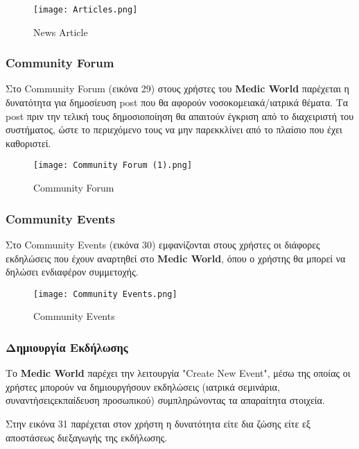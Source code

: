 \documentclass{article}
\begin{document}
\begin{figure}[!htb]
\centering
\texttt{[image: Articles.png]} 
\caption{\label{fig: news article} News Article}
\end{figure}

\subsubsection{Community Forum}

Στο Community Forum (εικόνα 29) στους χρήστες του \textbf{Medic World} παρέχεται η δυνατότητα για δημοσίευση post που θα αφορούν νοσοκομειακά/ιατρικά θέματα. Τα post πριν την τελική τους δημοσιοποίηση θα απαιτούν έγκριση από το διαχειριστή του συστήματος, ώστε το περιεχόμενο τους να μην παρεκκλίνει από το πλαίσιο που έχει καθοριστεί.

\vspace{0.3cm}

\begin{figure}[!htb]
\centering
\texttt{[image: Community Forum (1).png]} 
\caption{\label{fig: community forum} Community Forum}
\end{figure}

\newpage

\subsubsection{Community Events}

Στο Community Events (εικόνα 30) εμφανίζονται στους χρήστες οι διάφορες εκδηλώσεις που έχουν αναρτηθεί στο \textbf{Medic World}, όπου ο χρήστης θα μπορεί να δηλώσει ενδιαφέρον συμμετοχής.

\begin{figure}[!htb]
\centering
\texttt{[image: Community Events.png]} 
\caption{\label{fig: community events} Community Events}
\end{figure}

\subsubsection{Δημιουργία Εκδήλωσης}

Το \textbf{Medic World} παρέχει την λειτουργία "Create New Event", μέσω της οποίας οι χρήστες μπορούν να δημιουργήσουν εκδηλώσεις (ιατρικά σεμινάρια, συναντήσειςεκπαίδευση προσωπικού) συμπληρώνοντας τα απαραίτητα στοιχεία.
\par Στην εικόνα 31 παρέχεται στον χρήστη η δυνατότητα είτε δια ζώσης είτε εξ αποστάσεως διεξαγωγής της εκδήλωσης.
\end{document}
